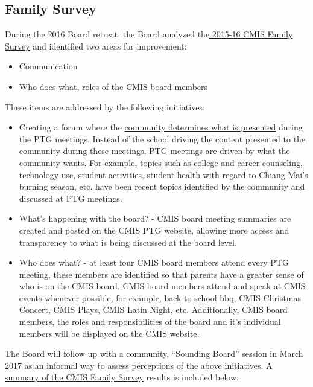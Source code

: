 
\subsection{Family Survey}

During the 2016 Board retreat, the Board analyzed the\href{https://docs.google.com/a/cmis.ac.th/forms/d/16Gbd3MzQOXtjjZ2dG460xw5SHG_eohMIKet3lxYUdAY/edit#responses}{ 2015-16 CMIS Family Survey} and identified two areas for improvement:
\begin{itemize}
\item Communication
\item Who does what, roles of the CMIS board members
\end{itemize}


These items are addressed by the following initiatives:
\begin{itemize}
\item Creating a forum where the \href{https://docs.google.com/document/d/1kiwakkg8eKdtEexCxVNx-m1CfC3VqxhukDy8WXDPGKY/edit?ts=58a2a142}{community determines what is presented} during the PTG meetings. Instead of the school driving the content presented to the community during these meetings, PTG meetings are driven by what the community wants. For example, topics such as college and career counseling, technology use, student activities, student health with regard to Chiang Mai’s burning season, etc. have been recent topics identified by the community and discussed at PTG meetings.
\item What’s happening with the board? - CMIS board meeting summaries are created and posted on the CMIS PTG website, allowing more access and transparency to what is being discussed at the board level.
\item Who does what? - at least four CMIS board members attend every PTG meeting, these members are identified so that parents have a greater sense of who is on the CMIS board. CMIS board members attend and speak at CMIS events whenever possible, for example, back-to-school bbq, CMIS Christmas Concert, CMIS Plays, CMIS Latin Night, etc. Additionally, CMIS board members, the roles and responsibilities of the board and it’s individual members will be displayed on the CMIS website.
\end{itemize}

The Board will follow up with a community, “Sounding Board” session in March 2017 as an informal way to assess perceptions of the above initiatives.  A \href{https://docs.google.com/a/cmis.ac.th/document/d/1_otvw47y3Z-1CSjXnKhgRTauVRqPl1S6nSdmsb00O2k/edit?usp=sharing}{summary of the CMIS Family Survey} results is included below:  


